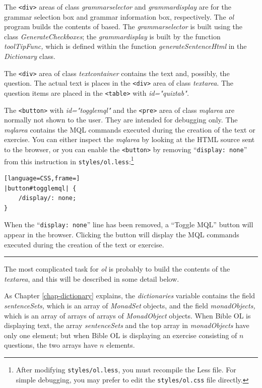 \documentclass[11pt,oneside,a4paper]{memoir}
\newcommand*{\xml}[1]{\texttt{<#1>}}
\begin{document}
The \xml{div} areas of class \emph{grammarselector} and \emph{grammardisplay} are for the grammar
selection box and grammar information box, respectively. The \emph{ol} program builds the contents
of based. The \emph{grammarselector} is built using the class \emph{GenerateCheckboxes}; the
\emph{grammardisplay} is built by the function \emph{toolTipFunc,} which is defined within the
function \emph{generateSentenceHtml} in the \emph{Dictionary} class.

The \xml{div} area of class \emph{textcontainer} contains the text and, possibly, the question. The
actual text is places in the \xml{div} area of class \emph{textarea}. The question items are placed
in the \xml{table} with \emph{id="quiztab".}

The \xml{button} with \emph{id="togglemql"} and the \xml{pre} area of class \emph{mqlarea} are
normally not shown to the user. They are intended for debugging only. The \emph{mqlarea} contains
the MQL commands executed during the creation of the text or exercise. You can either inspect the
\emph{mqlarea} by looking at the HTML source sent to the browser, or you can enable the \xml{button}
by removing ``\texttt{display:~none}'' from this instruction in
\texttt{styles/ol.less}:\footnote{After modifying \texttt{styles/ol.less}, you must recompile the
  Less file. For simple debugging, you may prefer to edit the \texttt{styles/ol.css} file directly.}

\begin{lstlisting}[language=CSS,frame=]
|button#togglemql| {
    /display/: none;
}
\end{lstlisting}

When the ``\texttt{display:~none}'' line has been removed, a ``Toggle MQL'' button will appear in
the browser. Clicking the button will display the MQL commands executed during the creation of the
text or exercise.

\pfbreak

The most complicated task for \emph{ol} is probably to build the contents of the \emph{textarea},
and this will be described in some detail below.

As Chapter \ref{chap-dictionary} explains, the \emph{dictionaries} variable contains the field
\emph{sentenceSets,} which is an array of \emph{MonadSet} objects, and the field
\emph{monadObjects,} which is an array of arrays of arrays of \emph{MonadObject} objects. When Bible
OL is displaying text, the array \emph{sentenceSets} and the top array in \emph{monadObjects} have
only one element; but when Bible OL is displaying an exercise consisting of $n$ questions, the
two arrays have $n$ elements.
\end{document}

